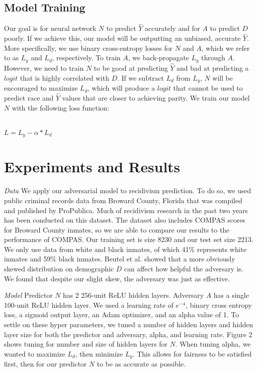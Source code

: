 \documentclass{article}
\begin{document}
\subsection{Model Training} 
\vspace{-3mm}
Our goal is for neural network $N$ to predict $\hat{Y}$ accurately and for $A$ to predict $D$ poorly. If we achieve this, our model will be outputting an unbiased, accurate $\hat{Y}$. More specifically, we use binary cross-entropy losses for $N$ and $A$, which we refer to as $L_y$ and $L_d$, respectively. To train $A$, we back-propagate $L_y$ through $A$. However, we need to train $N$ to be good at predicting $\hat{Y}$ and bad at predicting a $logit$ that is highly correlated with $D$. If we subtract $L_d$ from $L_y$, $N$ will be encouraged to maximize $L_d$, which will produce a $logit$ that cannot be used to predict race and $\hat{Y}$ values that are closer to achieving parity. We train our model $N$ with the following loss function:
\\
\\
\centerline{$L = L_y - \alpha*L_d$}
\vspace{-6mm}
\section{Experiments and Results}
\vspace{-2mm}
\textit{Data} We apply our adversarial model to recidivism prediction. To do so, we used public criminal records data from Broward County, Florida that was compiled and published by ProPublica. Much of recidivism research in the past two years has been conducted on this dataset. The dataset also includes COMPAS scores for Broward County inmates, so we are able to compare our results to the performance of COMPAS. Our training set is size 8230 and our test set size 2213. We only use data from white and black inmates, of which 41\% represents white inmates and 59\% black inmates. Beutel et al.  showed that a more obviously skewed distribution on demographic $D$ can affect how helpful the adversary is. We found that despite our slight skew, the adversary was just as effective.

\textit{Model} Predictor $N$ has 2 256-unit ReLU hidden layers. Adversary $A$ has a single 100-unit ReLU hidden layer. We used a learning rate of $e^{-4}$, binary cross entropy loss, a sigmoid output layer, an Adam optimizer, and an alpha value of 1. To settle on these hyper parameters, we tuned a number of hidden layers and hidden layer size for both the predictor and adversary, alpha, and learning rate. Figure 2 shows tuning for number and size of hidden layers for $N$. When tuning alpha, we wanted to maximize $L_d$, then minimize $L_y$. This allows for fairness to be satisfied first, then for our predictor $N$ to be as accurate as possible.
\end{document}
